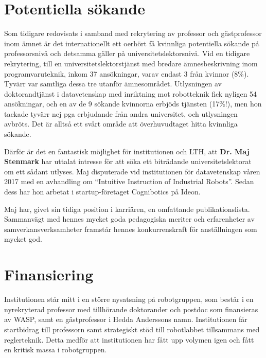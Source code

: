 \documentclass[11pt,a4paper]{article}
\begin{document}
\section{Potentiella sökande}
Som tidigare redovisats i samband med rekrytering av professor och gästprofessor inom ämnet är det internationellt ett oerhört få kvinnliga potentiella sökande på professorsnivå och detsamma gäller på universitetslektorsnivå. Vid en tidigare rekrytering, till en universitetslektorstjänst med bredare ämnesbeskrivning inom programvaruteknik, inkom 37 ansökningar, varav endast 3 från kvinnor (8\%). Tyvärr var samtliga dessa tre utanför ämnesområdet. Utlysningen av doktorandtjänst i datavetenskap med inriktning mot robotteknik fick nyligen 54 ansökningar, och en av de 9 sökande kvinnorna erbjöds tjänsten (17\%!), men hon tackade tyvärr nej pga erbjudande från andra universitet, och utlysningen avbröts. Det är alltså ett svårt område att överhuvudtaget hitta kvinnliga sökande. 

Därför är det en fantastisk möjlighet för institutionen och LTH, att \textbf{Dr. Maj Stenmark} har uttalat intresse för att söka ett biträdande universitetslektorat om ett sådant utlyses. Maj disputerade vid institutionen för datavetenskap våren 2017 med en avhandling om ``Intuitive Instruction of Industrial Robots''. Sedan dess har hon arbetat i startup-företaget Cognibotics på Ideon. 

Maj har, givet sin tidiga position i karriären, en omfattande publikationslista.  Sammanvägt med hennes mycket goda pedagogiska meriter och erfarenheter av samverkansverksamheter framstår hennes konkurrenskraft för anställningen som mycket god.

\section{Finansiering}
Institutionen står mitt i en större nysatsning på robotgruppen, som består i en nyrekryterad professor med tillhörande doktorander och postdoc som finansieras av WASP, samt en gästprofessor i Hedda Anderssons namn. Institutionen får startbidrag till professorn samt strategiskt stöd till robotlabbet tillsammans med reglerteknik. Detta medför att institutionen har fått upp volymen igen och fått en kritisk massa i robotgruppen. 
\end{document}

